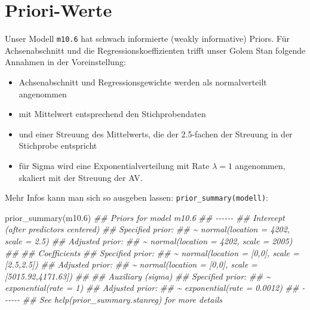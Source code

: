 \documentclass[
  a4paper,
  DIV=11]{scrreprt}
\newenvironment{Shaded}{\begin{snugshade}}{\end{snugshade}}
\newcommand{\DocumentationTok}[1]{\textcolor[rgb]{0.37,0.37,0.37}{\textit{#1}}}
\newcommand{\FloatTok}[1]{\textcolor[rgb]{0.68,0.00,0.00}{#1}}
\newcommand{\FunctionTok}[1]{\textcolor[rgb]{0.28,0.35,0.67}{#1}}
\newcommand{\NormalTok}[1]{\textcolor[rgb]{0.00,0.23,0.31}{#1}}
\providecommand{\tightlist}{%
  \setlength{\itemsep}{0pt}\setlength{\parskip}{0pt}}\usepackage{longtable,booktabs,array}
\theoremstyle{definition}
\theoremstyle{remark}
\begin{document}
\hypertarget{priori-werte}{%
\section{Priori-Werte}\label{priori-werte}}

Unser Modell \texttt{m10.6} hat schwach informierte (weakly informative)
Priors. Für Achsenabschnitt und die Regressionskoeffizienten trifft
unser Golem Stan folgende Annahmen in der Voreinstellung:

\begin{itemize}
\tightlist
\item
  Achsenabschnitt und Regressionsgewichte werden als normalverteilt
  angenommen
\item
  mit Mittelwert entsprechend den Stichprobendaten
\item
  und einer Streuung des Mittelwerts, die der 2.5-fachen der Streuung in
  der Stichprobe entspricht
\item
  für Sigma wird eine Exponentialverteilung mit Rate \(\lambda=1\)
  angenommen, skaliert mit der Streuung der AV.
\end{itemize}

Mehr Infos kann man sich so ausgeben lassen:
\texttt{prior\_summary(modell)}:

\begin{Shaded}
\begin{Highlighting}[]
\FunctionTok{prior\_summary}\NormalTok{(m10}\FloatTok{.6}\NormalTok{)}
\DocumentationTok{\#\# Priors for model \textquotesingle{}m10.6\textquotesingle{} }
\DocumentationTok{\#\# {-}{-}{-}{-}{-}{-}}
\DocumentationTok{\#\# Intercept (after predictors centered)}
\DocumentationTok{\#\#   Specified prior:}
\DocumentationTok{\#\#     \textasciitilde{} normal(location = 4202, scale = 2.5)}
\DocumentationTok{\#\#   Adjusted prior:}
\DocumentationTok{\#\#     \textasciitilde{} normal(location = 4202, scale = 2005)}
\DocumentationTok{\#\# }
\DocumentationTok{\#\# Coefficients}
\DocumentationTok{\#\#   Specified prior:}
\DocumentationTok{\#\#     \textasciitilde{} normal(location = [0,0], scale = [2.5,2.5])}
\DocumentationTok{\#\#   Adjusted prior:}
\DocumentationTok{\#\#     \textasciitilde{} normal(location = [0,0], scale = [5015.92,4171.63])}
\DocumentationTok{\#\# }
\DocumentationTok{\#\# Auxiliary (sigma)}
\DocumentationTok{\#\#   Specified prior:}
\DocumentationTok{\#\#     \textasciitilde{} exponential(rate = 1)}
\DocumentationTok{\#\#   Adjusted prior:}
\DocumentationTok{\#\#     \textasciitilde{} exponential(rate = 0.0012)}
\DocumentationTok{\#\# {-}{-}{-}{-}{-}{-}}
\DocumentationTok{\#\# See help(\textquotesingle{}prior\_summary.stanreg\textquotesingle{}) for more details}
\end{Highlighting}
\end{Shaded}
\end{document}
